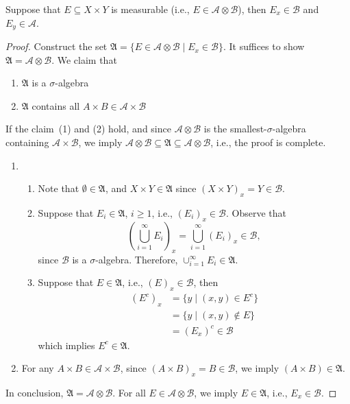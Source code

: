\begin{proposition}
Suppose that $E\subseteq X\times Y$ is measurable (i.e., $E\in\mathcal{A}\otimes\mathcal{B}$), then $E_x\in\mathcal{B}$ and $E_y\in\mathcal{A}$.
\end{proposition}
\begin{proof}
Construct the set $\mathfrak{A}=\{E\in\mathcal{A}\otimes\mathcal{B}\mid E_x\in\mathcal{B}\}.$
It suffices to show $\mathfrak{A}=\mathcal{A}\otimes\mathcal{B}$.
We claim that
\begin{enumerate}
\item
$\mathfrak{A}$ is a $\sigma$-algebra
\item
$\mathfrak{A}$ contains all $A\times B\in\mathcal{A}\times\mathcal{B}$
\end{enumerate}
If the claim~(1) and (2) hold, and since $\mathcal{A}\otimes\mathcal{B}$ is the smallest-$\sigma$-algebra containing $\mathcal{A}\times\mathcal{B}$,
we imply $\mathcal{A}\otimes\mathcal{B}\subseteq\mathfrak{A}\subseteq\mathcal{A}\otimes\mathcal{B}$, i.e., the proof is complete.



\begin{enumerate}
\item
\begin{enumerate}
\item
Note that $\emptyset\in\mathfrak{A}$, and 
$X\times Y\in\mathfrak{A}$
 since 
$(X\times Y)_x = Y\in\mathcal{B}$.
\item
Suppose that $E_i\in\mathfrak{A}$, $i\ge1$, i.e., $(E_i)_x\in\mathcal{B}$.
Observe that
\[
\left(
\bigcup_{i=1}^\infty E_i
\right)_x
=
\bigcup_{i=1}^\infty
(E_i)_x\in\mathcal{B},
\]
since $\mathcal{B}$ is a $\sigma$-algebra.
Therefore, $\cup_{i=1}^\infty E_i\in\mathfrak{A}$.
\item
Suppose that $E\in\mathfrak{A}$, i.e., $(E)_x\in\mathcal{B}$, then
\begin{align*}
(E^c)_x &=\{y\mid (x,y)\in E^c\}\\
&=\{y\mid (x,y)\notin E\}\\
&=(E_x)^c\in\mathcal{B}
\end{align*}
which implies $E^c\in\mathfrak{A}$.
\end{enumerate}
\item
For any $A\times B\in\mathcal{A}\times\mathcal{B}$, 
since $(A\times B)_x=B\in\mathcal{B}$, we imply $(A\times B)\in\mathfrak{A}$.
\end{enumerate}


In conclusion, $\mathfrak{A}=\mathcal{A}\otimes\mathcal{B}$.
For all $E\in \mathcal{A}\otimes\mathcal{B}$, we imply $E\in \mathfrak{A}$, i.e., $E_x\in\mathcal{B}$.
\end{proof}


